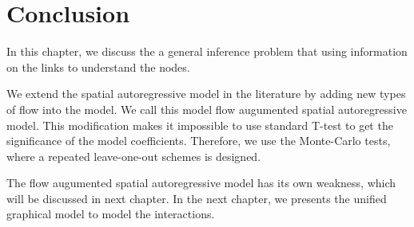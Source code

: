 \section{Conclusion}


In this chapter, we discuss the a general inference problem that using information on the links to understand the nodes.


We extend the spatial autoregressive model in the literature by adding new types of flow into the model.  We call this model flow augumented spatial autoregressive model. This modification makes it impossible to use standard T-test to get the significance of the model coefficients. Therefore, we use the Monte-Carlo tests, where a repeated leave-one-out schemes is designed.


The flow augumented spatial autoregressive model has its own weakness, which will be discussed in next chapter. In the next chapter, we presents the unified graphical model to model the interactions.
